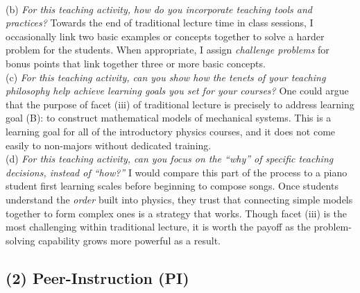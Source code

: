 \documentclass[../../../main.tex]{subfiles}
\begin{document}
\\
\vspace{0.25cm}
(b) \textit{For this teaching activity, how do you incorporate teaching tools and practices?} Towards the end of traditional lecture time in class sessions, I occasionally link two basic examples or concepts together to solve a harder problem for the students.  When appropriate, I assign \textit{challenge problems} for bonus points that link together three or more basic concepts.
\\
\vspace{0.25cm}
(c) \textit{For this teaching activity, can you show how the tenets of your teaching philosophy help achieve learning goals you set for your courses?}  One could argue that the purpose of facet (iii) of traditional lecture is precisely to address learning goal (B): to construct mathematical models of mechanical systems.  This is a learning goal for all of the introductory physics courses, and it does not come easily to non-majors without dedicated training.
\\
\vspace{0.25cm}
(d) \textit{For this teaching activity, can you focus on the ``why'' of specific teaching decisions, instead of ``how?''}  I would compare this part of the process to a piano student first learning scales before beginning to compose songs.  Once students understand the \textit{order} built into physics, they trust that connecting simple models together to form complex ones is a strategy that works.  Though facet (iii) is the most challenging within traditional lecture, it is worth the payoff as the problem-solving capability grows more powerful as a result.

\subsection{(2) Peer-Instruction (PI)}
\end{document}
